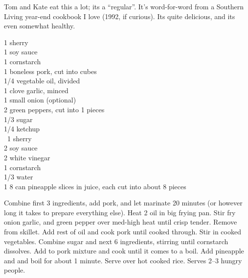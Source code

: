 \begin{open}
  Tom and Kate eat this a lot; its a ``regular''. It's word-for-word from a
  Southern Living year-end cookbook I love (1992, if curious). Its quite
  delicious, and its even somewhat healthy.
\end{open}
\begin{ingredients}
  \SI{1}{\tblspoon} sherry\\
  \SI{1}{\tblspoon} soy sauce\\
  \SI{1}{\tblspoon} cornstarch\\
  \SI{1}{\pound} boneless pork, cut into cubes\\
  \SI{1/4}{\cup} vegetable oil, divided\\
  1 clove garlic, minced\\
  1 small onion (optional)\\
  2 green peppers, cut into \SI{1}{\inch} pieces\\
  \SI{1/3}{\cup} sugar\\
  \SI{1/4}{\cup} ketchup\\\
  \SI{1}{\tblspoon} sherry\\
  \SI{2}{\tblspoon} soy sauce\\
  \SI{2}{\tblspoon} white vinegar\\
  \SI{1}{\tblspoon} cornstarch\\
  \SI{1/3}{\cup} water\\
  1 \SI{8}{\ounce} can pineapple slices in juice, each cut into about 8 pieces
\end{ingredients}
Combine first 3 ingredients, add pork, and let marinate 20 minutes (or
however long it takes to prepare everything else). Heat \SI{2}{\tblspoon} oil
in big frying pan.  Stir fry onion garlic, and green pepper over med-high heat
until crisp tender.  Remove from skillet. Add rest of oil and cook pork until
cooked through.  Stir in cooked vegetables. Combine sugar and next 6
ingredients, stirring until cornstarch dissolves. Add to pork mixture and cook
until it comes to a boil. Add pineapple and and boil for about
1 minute. Serve over hot cooked rice. Serves \numrange{2}{3} hungry
people.